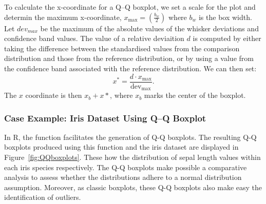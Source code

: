 \documentclass{article}\usepackage[]{graphicx}\usepackage[]{xcolor}
\numberwithin{equation}{section}
\begin{document}
\noindent
To calculate the x-coordinate for a Q–Q boxplot, we set a scale for the plot and determin the maximum x-coordinate, $x_{\text{max}}=(\frac{b_w}{2})$ where $b_w$ is the box width. Let $dev_{max}$ be the maximum of the absolute values of the whisker deviations and confidence band values. The value of a relative deviaition $d$ is computed by either taking the difference between the standardised values from the comparison distribution and those from the reference distribution, or by using a value from the confidence band associated with the reference distribution. We can then set:
$$x^* = \frac{d \cdot x_{\text{max}}}{\text{dev}_{\text{max}}}.$$
The $x$ coordinate is then $x_b+x*$, where $x_b$ marks the center of the boxplot.

\newpage 

\subsubsection{Case Example: Iris Dataset Using Q–Q Boxplot}

\noindent In R, the  function facilitates the generation of Q-Q boxplots. The resulting Q-Q boxplots produced using this function and the iris dataset are displayed in Figure~\ref{fig:QQboxplots}. These how the distribution of sepal length values within each iris species respectively. The Q-Q boxplots make possible a comparative analysis to assess whether the distributions adhere to a normal distribution assumption. Moreover, as classic boxplots, these Q-Q boxplots also make easy the identification of outliers.\\ 
\end{document}
